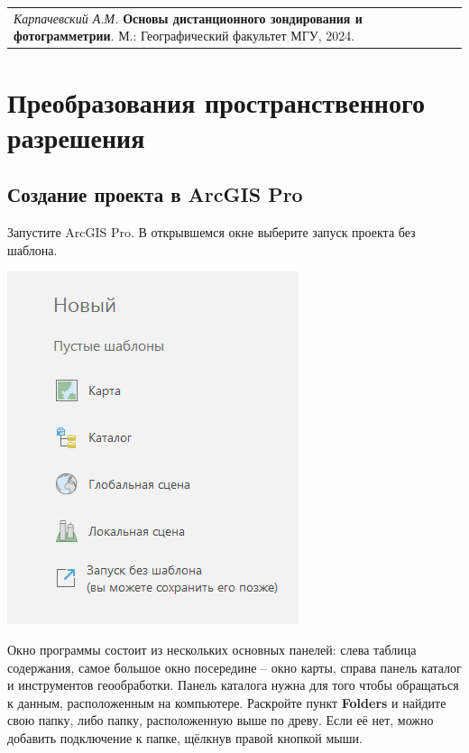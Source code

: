 \documentclass[
  12pt,
]{book}
\begin{document}
\begin{longtable}[]{@{}l@{}}
\toprule\noalign{}
\endhead
\bottomrule\noalign{}
\endlastfoot
\emph{Карпачевский А.М.} \textbf{Основы дистанционного зондирования и фотограмметрии}. М.: Географический факультет МГУ, 2024. \\
\end{longtable}

\hypertarget{pansharpen}{%
\chapter{Преобразования пространственного разрешения}\label{pansharpen}}

\hypertarget{pansharpen-project}{%
\section{Создание проекта в ArcGIS Pro}\label{pansharpen-project}}

Запустите ArcGIS Pro. В открывшемся окне выберите запуск проекта без шаблона.

\includegraphics{images/Ref01/Launching.png}

Окно программы состоит из нескольких основных панелей: слева таблица содержания, самое большое окно посередине -- окно карты, справа панель каталог и инструментов геообработки. Панель каталога нужна для того чтобы обращаться к данным, расположенным на компьютере. Раскройте пункт \textbf{Folders} и найдите свою папку, либо папку, расположенную выше по древу. Если её нет, можно добавить подключение к папке, щёлкнув правой кнопкой мыши.
\end{document}
